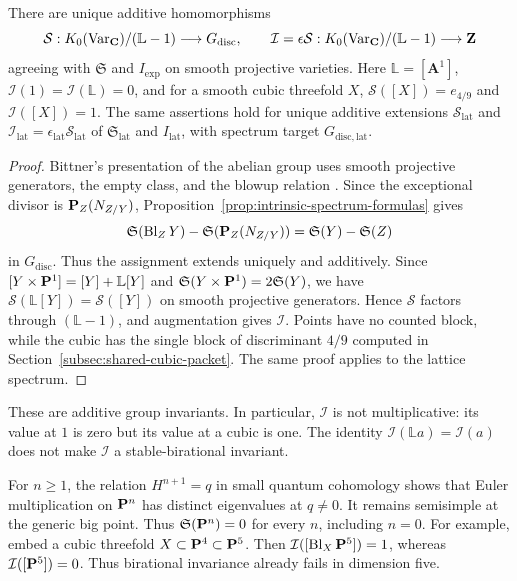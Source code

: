 \begin{theorem}
\label{thm:additive-motivic-marker}
%
%
%
There are unique additive homomorphisms
\[
 \mathcal S:K_0(\operatorname{Var}_{\mathbf C})/(\mathbb L-1)\longrightarrow G_{\mathrm{disc}},
 \qquad
 \mathcal I=\epsilon\mathcal S:
 K_0(\operatorname{Var}_{\mathbf C})/(\mathbb L-1)\longrightarrow\mathbf Z
\]
agreeing with \(\mathfrak S\) and \(I_{\mathrm{exp}}\) on smooth projective
varieties.  Here \(\mathbb L=[\mathbf A^1]\),
\(\mathcal I(1)=\mathcal I(\mathbb L)=0\), and for a smooth cubic
threefold \(X\), \(\mathcal S([X])=e_{4/9}\) and \(\mathcal I([X])=1\).
The same assertions hold for unique additive extensions
\(\mathcal S_{\mathrm{lat}}\) and
\(\mathcal I_{\mathrm{lat}}=\epsilon_{\mathrm{lat}}\mathcal S_{\mathrm{lat}}\)
of \(\mathfrak S_{\mathrm{lat}}\) and \(I_{\mathrm{lat}}\), with spectrum
target \(G_{\mathrm{disc,lat}}\).
\end{theorem}

\begin{proof}
Bittner's presentation of the abelian group uses smooth projective
generators, the empty class, and the blowup relation
\cite[Theorem~3.1]{Bittner}.  Since the exceptional divisor is
\(\mathbf P_Z(N_{Z/Y})\), Proposition~\ref{prop:intrinsic-spectrum-formulas} gives
\[
 \mathfrak S(\operatorname{Bl}_ZY)-\mathfrak S(\mathbf P_Z(N_{Z/Y}))
 =\mathfrak S(Y)-\mathfrak S(Z)
\]
in \(G_{\mathrm{disc}}\).  Thus the assignment extends uniquely and additively.
Since $[Y\times\mathbf P^1]=[Y]+\mathbb L[Y]$ and
$\mathfrak S(Y\times\mathbf P^1)=2\mathfrak S(Y)$, we have
$\mathcal S(\mathbb L[Y])=\mathcal S([Y])$ on smooth projective
generators. Hence $\mathcal S$ factors through $(\mathbb L-1)$, and
augmentation gives $\mathcal I$. Points have no counted block, while the cubic has the
single block of discriminant \(4/9\) computed in
Section~\ref{subsec:shared-cubic-packet}.
The same proof applies to the lattice spectrum.
%
%
\end{proof}

These are additive group invariants.  In particular, \(\mathcal I\) is
not multiplicative: its value at \(1\) is zero but its value at a cubic
is one.  The identity \(\mathcal I(\mathbb L a)=\mathcal I(a)\) does not make
\(\mathcal I\) a stable-birational invariant.

For \(n\geq1\), the relation \(H^{n+1}=q\) in small quantum cohomology
shows that Euler multiplication on \(\mathbf P^n\) has distinct eigenvalues at
\(q\ne0\).  It remains semisimple at the generic big point.  Thus
\(\mathfrak S(\mathbf P^n)=0\) for every \(n\), including \(n=0\).
For example, embed a cubic threefold \(X\subset\mathbf P^4\subset\mathbf P^5\).
Then \(\mathcal I([\operatorname{Bl}_X\mathbf P^5])=1\), whereas
\(\mathcal I([\mathbf P^5])=0\).  Thus birational invariance already fails
in dimension five.

